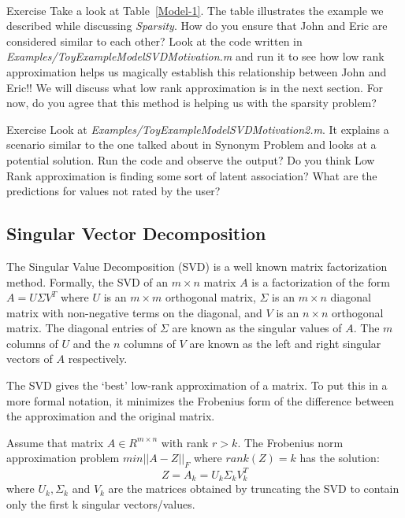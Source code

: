 \\
\begin{myremark}{Exercise }
Take a look at Table~\ref{Model-1}. The table illustrates the example we described while discussing \textit{Sparsity}. How do you ensure that John and Eric are considered similar to each other? Look at the code written in \textit{Examples/ToyExampleModelSVDMotivation.m} and run it to see how low rank approximation helps us magically establish this relationship between John and Eric!! We will discuss what low rank approximation is in the next section.  For now, do you agree that this method is helping us with the sparsity problem? 
\end{myremark}

\begin{myremark}{Exercise }
Look at \textit{Examples/ToyExampleModelSVDMotivation2.m}. It explains a scenario similar to the one talked about in Synonym Problem and looks at a potential solution. Run the code and observe the output? Do you think Low Rank approximation is finding some sort of latent association? What are the predictions for values not rated by the user?
\end{myremark}
  \subsection{Singular Vector Decomposition}

The Singular Value Decomposition (SVD) is a well known matrix factorization method. Formally, the SVD of an $m \times n$ matrix $A$ is a factorization of the form $A = U \Sigma V^{T}$ where $U$ is an $m \times m$ orthogonal matrix, $\Sigma$ is an $m \times n$ diagonal matrix with non-negative terms on the diagonal, and $V$ is an $n \times n$ orthogonal matrix. The diagonal entries of $\Sigma$ are known as the singular values of $A$. The $m$ columns of $U$ and the $n$ columns of $V$ are known as the left and right singular vectors of $A$ respectively. 

The SVD gives the `best' low-rank approximation of a matrix. To put this in a more formal notation, it minimizes the Frobenius form of the difference between the approximation and the original matrix.

Assume that matrix $A \in R^{m \times n}$ with rank $r > k$. The Frobenius norm approximation problem $min || A - Z ||_{F}$ where $rank(Z) = k$ has the solution:
\[Z = A_{k} = U_{k} \Sigma_{k} V_{k}^{T}\]
where $U_{k}, \Sigma_{k}$ and $V_{k}$ are the matrices obtained by truncating the SVD to contain only the first k singular vectors/values.

